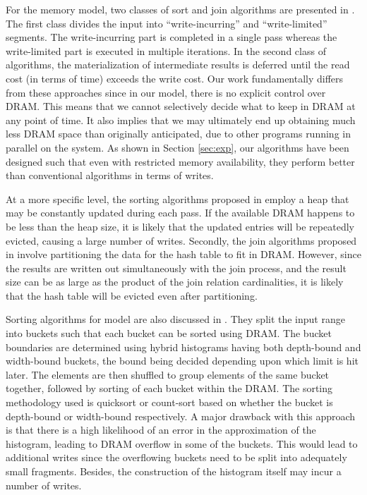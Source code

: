 For the \modelExplicit{} memory model, two classes of sort and
join algorithms are presented in \cite{viglas}.  The first class
divides the input into ``write-incurring'' and ``write-limited''
segments. The write-incurring part is completed in a single pass
whereas the write-limited part is executed in multiple iterations.
In the second class of algorithms, the materialization of intermediate
results is deferred until the read cost (in terms of time) exceeds
the write cost.  Our work fundamentally differs from these approaches
since in our \model{} model, there is no explicit control over DRAM.
This means that we cannot selectively decide what to keep in DRAM at any
point of time. It also implies that we may ultimately end up obtaining
much less DRAM space than originally anticipated, due to other programs
running in parallel on the system. As shown in Section \ref{sec:exp},
our algorithms have been designed such that even with restricted memory
availability, they perform better than conventional algorithms in terms
of writes. 

At a more specific level, the sorting algorithms proposed in \cite{viglas}
employ a heap that may be constantly updated during each pass. If the
available DRAM happens to be less than the heap size, it is likely
that the updated entries will be repeatedly evicted, causing a large
number of writes. Secondly, the join algorithms proposed in \cite{viglas}
involve partitioning the data for the hash table to fit in DRAM. However,
since the results are written out simultaneously with the join process,
and the result size can be as large as the product of the join relation
cardinalities, it is likely that the hash table will be evicted even
after partitioning.

Sorting algorithms for \modelExplicit{} model are also discussed in
\cite{vamsi}. They split the input range into buckets such that each
bucket can be sorted using DRAM. The bucket boundaries are determined
using hybrid histograms having both depth-bound and width-bound buckets,
the bound being decided depending upon which limit is hit later.
The elements are then shuffled to group elements of the same bucket
together, followed by sorting of each bucket within the DRAM. The
sorting methodology used is quicksort or count-sort based on whether
the bucket is depth-bound or width-bound respectively. A major drawback
with this approach is that there is a high likelihood of an error in
the approximation of the histogram, leading to DRAM overflow in some of
the buckets. This would lead to additional writes since the overflowing
buckets need to be split into adequately small fragments. Besides,
the construction of the histogram itself may incur a number of writes.

